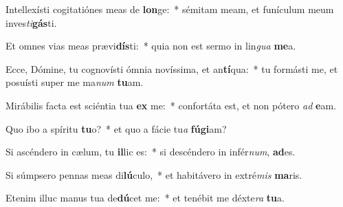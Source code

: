 \item Intellexísti cogitatiónes meas de \textbf{lon}ge:~* sémitam meam, et funículum meum inves\textit{ti}\textbf{gás}ti.
\item Et omnes vias meas prævi\textbf{dís}ti:~* quia non est sermo in lin\textit{gua} \textbf{me}a.
\item Ecce, Dómine, tu cognovísti ómnia novíssima, et an\textbf{tí}qua:~* tu formásti me, et posuísti super me ma\textit{num} \textbf{tu}am.
\item Mirábilis facta est sciéntia tua \textbf{ex} me:~* confortáta est, et non pótero \textit{ad} \textbf{e}am.
\item Quo ibo a spíritu \textbf{tu}o?~* et quo a fácie tu\textit{a} \textbf{fú}\textbf{gi}am?
\item Si ascéndero in cælum, tu \textbf{il}lic es:~* si descéndero in infér\textit{num}, \textbf{ad}es.
\item Si súmpsero pennas meas di\textbf{lú}culo,~* et habitávero in extré\textit{mis} \textbf{ma}ris.
\item Etenim illuc manus tua de\textbf{dú}cet me:~* et tenébit me déxte\textit{ra} \textbf{tu}a.
